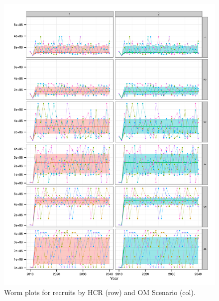 \documentclass[a4paper, 10pt]{article}
\begin{document}
\begin{figure}[htbp]
\centering
\includegraphics[width=6in]{iR.png}
\caption{Worm plots for recruits by HCR (row) and OM Scenario (col).}
\label{fig:3}
\end{figure}
\end{document}
